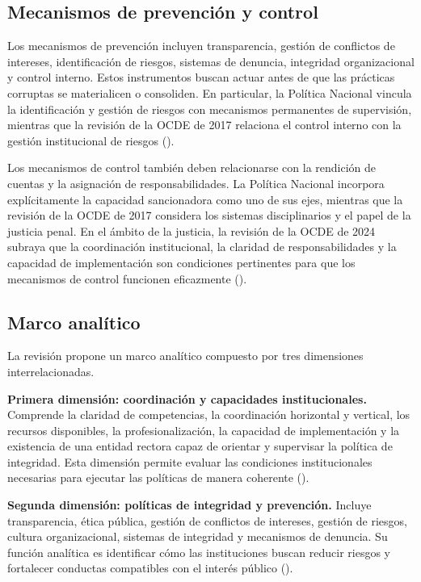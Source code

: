\documentclass[Afour,sageh,times]{sagej}
\begin{document}
\subsection{Mecanismos de prevención y control}
Los mecanismos de prevención incluyen transparencia, gestión de conflictos de intereses, identificación de riesgos, sistemas de denuncia, integridad organizacional y control interno. Estos instrumentos buscan actuar antes de que las prácticas corruptas se materialicen o consoliden. En particular, la Política Nacional vincula la identificación y gestión de riesgos con mecanismos permanentes de supervisión, mientras que la revisión de la OCDE de 2017 relaciona el control interno con la gestión institucional de riesgos (\citealp{pcm2017politica,oecd2017integrity}).

Los mecanismos de control también deben relacionarse con la rendición de cuentas y la asignación de responsabilidades. La Política Nacional incorpora explícitamente la capacidad sancionadora como uno de sus ejes, mientras que la revisión de la OCDE de 2017 considera los sistemas disciplinarios y el papel de la justicia penal. En el ámbito de la justicia, la revisión de la OCDE de 2024 subraya que la coordinación institucional, la claridad de responsabilidades y la capacidad de implementación son condiciones pertinentes para que los mecanismos de control funcionen eficazmente (\citealp{pcm2017politica,oecd2017integrity,oecd2024justice}).

\subsection{Marco analítico}
La revisión propone un marco analítico compuesto por tres dimensiones interrelacionadas.

\textbf{Primera dimensión: coordinación y capacidades institucionales.} Comprende la claridad de competencias, la coordinación horizontal y vertical, los recursos disponibles, la profesionalización, la capacidad de implementación y la existencia de una entidad rectora capaz de orientar y supervisar la política de integridad. Esta dimensión permite evaluar las condiciones institucionales necesarias para ejecutar las políticas de manera coherente (\citealp{oecd2024sistema,munive2022integridad}).

\textbf{Segunda dimensión: políticas de integridad y prevención.} Incluye transparencia, ética pública, gestión de conflictos de intereses, gestión de riesgos, cultura organizacional, sistemas de integridad y mecanismos de denuncia. Su función analítica es identificar cómo las instituciones buscan reducir riesgos y fortalecer conductas compatibles con el interés público (\citealp{pcm2017politica,oecd2017integrity}).
\end{document}
